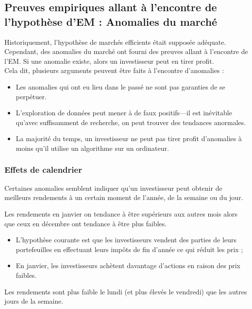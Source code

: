 \documentclass[10pt, french]{article}
\begin{document}
\begin{multicols*}{2}
\columnbreak
\subsection{Preuves empiriques allant à l'encontre de l'hypothèse d'EM : Anomalies du marché}
Historiquement, l'hypothèse de marchés efficients était supposée adéquate. Cependant, des anomalies du marché ont fourni des preuves allant à l'encontre de l'EM. Si une anomalie existe, alors un investisseur peut en tirer profit.\\

Cela dit, plusieurs arguments peuvent être faits à l'encontre d'anomalies :
\begin{itemize}
	\item	Les anomalies qui ont eu lieu dans le passé ne sont pas garanties de se perpétuer.
	\item	L'exploration de données peut mener à de faux positifs---il est inévitable qu'avec suffisamment de recherche, on peut trouver des tendances anormales.
	\item	La majorité du temps, un investisseur ne peut pas tirer profit d'anomalies à moins qu'il utilise un algorithme sur un ordinateur.
\end{itemize}

\subsubsection{Effets de calendrier}
Certaines anomalies semblent indiquer qu'un investisseur peut obtenir de meilleurs rendements à un certain moment de l'année, de la semaine ou du jour.

\begin{definitionNOHFILLprop}
Les rendements en janvier on tendance à être supérieurs aux autres mois alors que ceux en décembre ont tendance à être plus faibles.
\begin{itemize}
	\item	L'hypothèse courante est que les investisseurs vendent des parties de leurs portefeuilles en effectuant leurs impôts de fin d'année ce qui réduit les prix ;
	\item	En janvier, les investisseurs achètent davantage d'actions en raison des prix faibles.
\end{itemize}
\end{definitionNOHFILLprop}

\begin{definitionNOHFILLprop}
Les rendements sont plus faible le lundi (et plus élevés le vendredi) que les autres jours de la semaine.


\end{definitionNOHFILLprop}
\end{multicols*}
\end{document}
